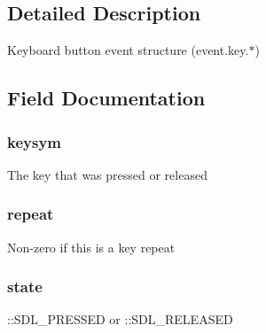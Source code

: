 \subsection{Detailed Description}
Keyboard button event structure (event.\+key.$\ast$) 

\subsection{Field Documentation}
\subsubsection[{\texorpdfstring{keysym}{keysym}}]{ keysym}\hypertarget{struct_s_d_l___keyboard_event_a798f36b96d39e1dd994f72890632cf4f}{}\label{struct_s_d_l___keyboard_event_a798f36b96d39e1dd994f72890632cf4f}
The key that was pressed or released 
\subsubsection[{\texorpdfstring{repeat}{repeat}}]{ repeat}\hypertarget{struct_s_d_l___keyboard_event_a719e1ec1b2969d941426593f9822ef6d}{}\label{struct_s_d_l___keyboard_event_a719e1ec1b2969d941426593f9822ef6d}
Non-\/zero if this is a key repeat 
\subsubsection[{\texorpdfstring{state}{state}}]{ state}\hypertarget{struct_s_d_l___keyboard_event_a6b8d8e916bc56265a3fd279bd26b6d1b}{}\label{struct_s_d_l___keyboard_event_a6b8d8e916bc56265a3fd279bd26b6d1b}
\+::\+S\+D\+L\+\_\+\+P\+R\+E\+S\+S\+ED or \+::\+S\+D\+L\+\_\+\+R\+E\+L\+E\+A\+S\+ED 
